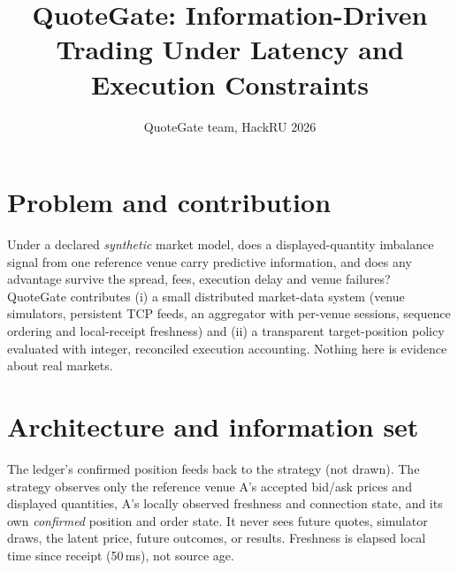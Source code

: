 \documentclass[10pt,twocolumn]{article}
\title{\vspace{-0.5in}\large QuoteGate: Information-Driven Trading Under Latency and Execution Constraints}
\author{\small QuoteGate team, HackRU 2026}
\date{\vspace{-0.35in}}
\begin{document}
\maketitle

\section{Problem and contribution}
Under a declared \emph{synthetic} market model, does a displayed-quantity imbalance signal from one
reference venue carry predictive information, and does any advantage survive the spread, fees,
execution delay and venue failures? QuoteGate contributes (i) a small distributed market-data system
(venue simulators, persistent TCP feeds, an aggregator with per-venue sessions, sequence ordering and
local-receipt freshness) and (ii) a transparent target-position policy evaluated with integer,
reconciled execution accounting. Nothing here is evidence about real markets.

\section{Architecture and information set}
\begin{center}\scriptsize
{}\end{center}
{\footnotesize The ledger's confirmed position feeds back to the strategy (not drawn).}
The strategy observes only the reference venue A's accepted bid/ask prices and displayed quantities,
A's locally observed freshness and connection state, and its own \emph{confirmed} position and order
state. It never sees future quotes, simulator draws, the latent price, future outcomes, or results.
Freshness is elapsed local time since receipt (50\,ms), not source age.
\end{document}
